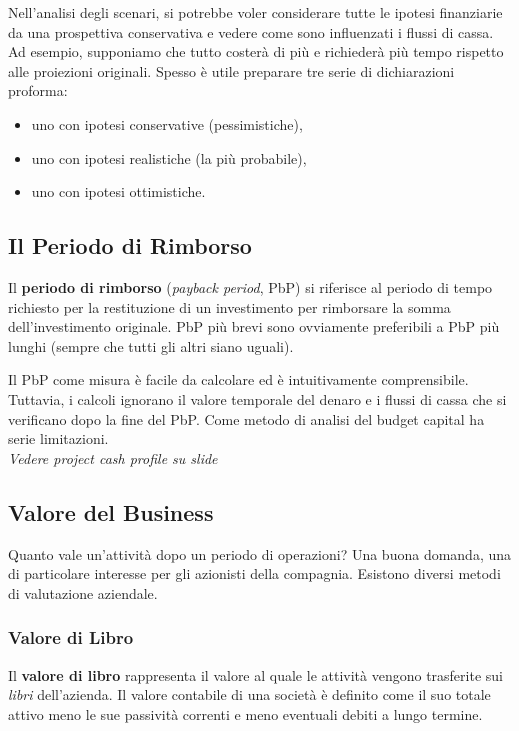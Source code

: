 \documentclass[a4paper,portrait,12pt]{article}
\theoremstyle{definition}
\begin{document}
Nell'analisi degli scenari, si potrebbe voler considerare tutte le ipotesi finanziarie da una prospettiva conservativa e vedere come sono influenzati i flussi di cassa.
Ad esempio, supponiamo che tutto costerà di più e richiederà più tempo rispetto alle proiezioni originali.
Spesso è utile preparare tre serie di dichiarazioni proforma:
\begin{itemize}
\item uno con ipotesi conservative (pessimistiche),
\item uno con ipotesi realistiche (la più probabile),
\item uno con ipotesi ottimistiche.
\end{itemize}


\subsection{Il Periodo di Rimborso}


Il \textbf{periodo di rimborso} (\emph{payback period}, PbP) si riferisce al periodo di tempo richiesto per la restituzione di un investimento per rimborsare la somma dell'investimento originale.
PbP più brevi sono ovviamente preferibili a PbP più lunghi (sempre che tutti gli altri siano uguali).

Il PbP come misura è facile da calcolare ed è intuitivamente comprensibile.
Tuttavia, i calcoli ignorano il valore temporale del denaro e i flussi di cassa che si verificano dopo la fine del PbP.
Come metodo di analisi del budget capital ha serie limitazioni.\\

\emph{Vedere project cash profile su slide}


\subsection{Valore del Business}


Quanto vale un'attività dopo un periodo di operazioni?
Una buona domanda, una di particolare interesse per gli azionisti della compagnia.
Esistono diversi metodi di valutazione aziendale.

\subsubsection{Valore di Libro}

Il \textbf{valore di libro} rappresenta il valore al quale le attività vengono trasferite sui \emph{libri} dell'azienda.
Il valore contabile di una società è definito come il suo totale attivo meno le sue passività correnti e meno eventuali debiti a lungo termine.\\
\end{document}
